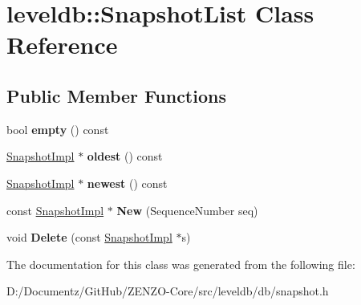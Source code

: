\hypertarget{classleveldb_1_1_snapshot_list}{}\section{leveldb\+::Snapshot\+List Class Reference}
\label{classleveldb_1_1_snapshot_list}
\subsection*{Public Member Functions}
\begin{DoxyCompactItemize}
\item 
\mbox{\label{classleveldb_1_1_snapshot_list_a1db6b1cbcd79669168052e088e8af84e}} 
bool {\bfseries empty} () const
\item 
\mbox{\label{classleveldb_1_1_snapshot_list_a2a7757163b6f737771430e3ea1697963}} 
\mbox{\hyperlink{classleveldb_1_1_snapshot_impl}{Snapshot\+Impl}} $\ast$ {\bfseries oldest} () const
\item 
\mbox{\label{classleveldb_1_1_snapshot_list_ae4480f4d9059d78623773b7e87aad11b}} 
\mbox{\hyperlink{classleveldb_1_1_snapshot_impl}{Snapshot\+Impl}} $\ast$ {\bfseries newest} () const
\item 
\mbox{\label{classleveldb_1_1_snapshot_list_adfd5d9c7cb888e711d83a48299141994}} 
const \mbox{\hyperlink{classleveldb_1_1_snapshot_impl}{Snapshot\+Impl}} $\ast$ {\bfseries New} (Sequence\+Number seq)
\item 
\mbox{\label{classleveldb_1_1_snapshot_list_aa16863f35b8bb6dbc44f4528fab6790a}} 
void {\bfseries Delete} (const \mbox{\hyperlink{classleveldb_1_1_snapshot_impl}{Snapshot\+Impl}} $\ast$s)
\end{DoxyCompactItemize}


The documentation for this class was generated from the following file\+:\begin{DoxyCompactItemize}
\item 
D\+:/\+Documentz/\+Git\+Hub/\+Z\+E\+N\+Z\+O-\/\+Core/src/leveldb/db/snapshot.\+h\end{DoxyCompactItemize}
